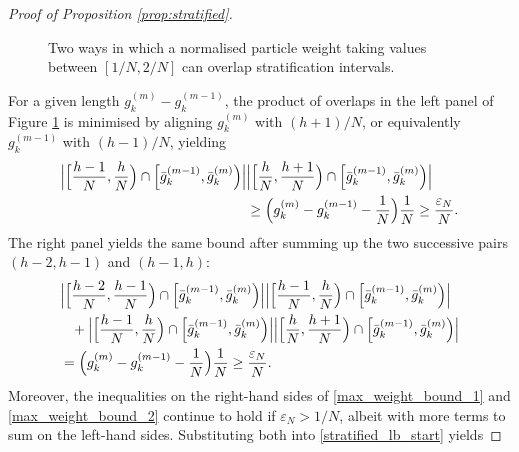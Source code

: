 \documentclass[10pt,a4paper]{amsart}
\begin{document}
\begin{proof}[Proof of Proposition \ref{prop:stratified}]
\begin{figure}[!ht]
\caption{Two ways in which a normalised particle weight taking values between $[1/N, 2/N]$ can overlap stratification intervals.}
\label{fig:max_weight}
\end{figure}
\noindent
For a given length $g_k^{(m)} - g_k^{(m - 1)}$, the product of overlaps in the left panel of Figure \ref{fig:max_weight} is minimised by aligning $g_k^{(m)}$ with $(h + 1) / N$, or equivalently $g_k^{(m - 1)}$ with $(h - 1) / N$, yielding
\begin{align}
\Big| \Big[ \frac{ h - 1 }{ N }, \frac{ h }{ N } \Big) \cap \Big[ \bar{ g }_k^{ ( m - 1 ) }, \bar{ g }_k^{ ( m ) } \Big) \Big| &\Big| \Big[ \frac{ h }{ N }, \frac{ h + 1 }{ N } \Big) \cap \Big[ \bar{ g }_k^{ ( m - 1 ) }, \bar{ g }_k^{ ( m ) } \Big) \Big| \notag \\
&\geq \Big(g_k^{(m)} - g_k^{(m - 1)} - \frac{1}{N}\Big) \frac{1}{N} \geq \frac{\varepsilon_N}{N}. \label{max_weight_bound_1}
\end{align}
The right panel yields the same bound after summing up the two successive pairs $(h - 2, h - 1)$ and $(h - 1, h)$:
\begin{align}
&\Big| \Big[ \frac{ h - 2 }{ N }, \frac{ h - 1 }{ N } \Big) \cap \Big[ \bar{ g }_k^{ ( m - 1 ) }, \bar{ g }_k^{ ( m ) } \Big) \Big| \Big| \Big[ \frac{ h - 1 }{ N }, \frac{ h }{ N } \Big) \cap \Big[ \bar{ g }_k^{ ( m - 1 ) }, \bar{ g }_k^{ ( m ) } \Big) \Big| \notag \\
&\phantom{\geq}+ \Big| \Big[ \frac{ h - 1 }{ N }, \frac{ h }{ N } \Big) \cap \Big[ \bar{ g }_k^{ ( m - 1 ) }, \bar{ g }_k^{ ( m ) } \Big) \Big| \Big| \Big[ \frac{ h }{ N }, \frac{ h + 1 }{ N } \Big) \cap \Big[ \bar{ g }_k^{ ( m - 1 ) }, \bar{ g }_k^{ ( m ) } \Big) \Big| \notag \\
&= \Big(g_k^{(m)} - g_k^{(m - 1)} - \frac{1}{N}\Big) \frac{1}{N} \geq \frac{\varepsilon_N}{N}. \label{max_weight_bound_2}
\end{align}
Moreover, the inequalities on the right-hand sides of \eqref{max_weight_bound_1} and \eqref{max_weight_bound_2} continue to hold if $\varepsilon_N > 1/N$, albeit with more terms to sum on the left-hand sides.
Substituting both into \eqref{stratified_lb_start} yields

\end{proof}
\end{document}
